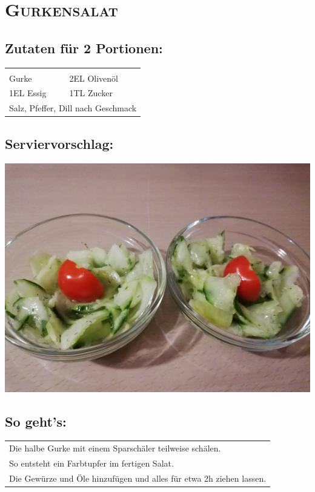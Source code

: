 \section{\textsc{Gurkensalat}}

\subsection*{Zutaten für 2 Portionen:}

\begin{tabular}{p{7.5cm} p{7.5cm}}
	& \\
	\sfrac{1}{2} Gurke & 2EL Olivenöl \\
	1EL Essig & 1TL Zucker \\
	\multicolumn{2}{l}{Salz, Pfeffer, Dill nach Geschmack}
\end{tabular}

\subsection*{Serviervorschlag:}

\includegraphics[width=\textwidth]{img/gurkensalat/gurkensalat_fertig.jpg} \cite{gurkensalat}

\subsection*{So geht's:}

\begin{tabular}{p{15cm}}
	\\
	Die halbe Gurke mit einem Sparschäler teilweise schälen.\\
	So entsteht ein Farbtupfer im fertigen Salat.\\
	Die Gewürze und Öle hinzufügen und alles für etwa 2h ziehen lassen.
\end{tabular}